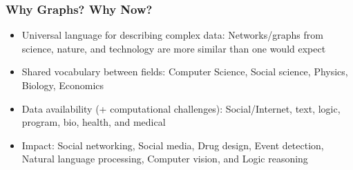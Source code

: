 



\begin{frame}[fragile]\frametitle{Why Graphs? Why Now?}

\begin{itemize}
\item Universal language for describing complex data: Networks/graphs from science, nature, and technology are more similar than one would expect
\item Shared vocabulary between fields: Computer Science, Social science, Physics, Biology, Economics 
\item Data availability (+ computational challenges): Social/Internet, text, logic, program, bio, health, and medical
\item Impact: Social networking, Social media, Drug design, Event detection, Natural language processing, Computer vision, and Logic reasoning
\end{itemize}

\end{frame}


